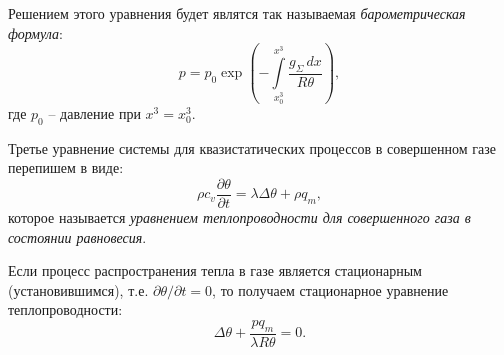 Решением этого уравнения будет являтся так называемая \emph{барометрическая формула}:
\[
  p = p_0 \exp \left( - \int\limits_{x^3_0}^{x^3} \dfrac{g_\Sigma \, dx}{R\theta} \right),
\]
где $p_0$ -- давление при $x^3 = x^3_0$.

Третье уравнение системы для квазистатических процессов в совершенном газе перепишем в виде:
\[
  \rho c_v \dfrac{\partial \theta}{\partial t} = \lambda \Delta \theta + \rho q_m,
\]
которое называется \emph{уравнением теплопроводности для совершенного газа в состоянии
равновесия}.

Если процесс распространения тепла в газе является стационарным (установившимся), т.е. 
$\partial \theta / \partial t = 0$, то получаем стационарное уравнение теплопроводности:
\[
  \Delta \theta + \dfrac{pq_m}{\lambda R \theta} = 0.
\]


